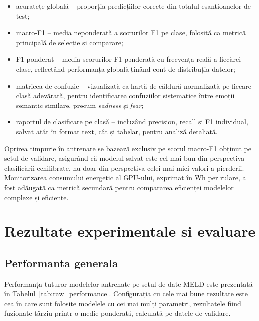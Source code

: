 \documentclass[12pt, a4paper]{article}
\begin{document}
\begin{itemize}
\item acuratețe globală -- proporția predicțiilor corecte din totalul eșantioanelor de test;
\item macro-F1 -- media neponderată a scorurilor F1 pe clase, folosită ca metrică principală de selecție și comparare;
\item F1 ponderat -- media scorurilor F1 ponderată cu frecvența reală a fiecărei clase, reflectând performanța globală ținând cont de distribuția datelor;
\item matricea de confuzie -- vizualizată ca hartă de căldură normalizată pe fiecare clasă adevărată, pentru identificarea confuziilor sistematice între emoții semantic similare, precum \textit{sadness} și \textit{fear};
\item raportul de clasificare pe clasă -- incluzând precision, recall și F1 individual, salvat atât în format text, cât și tabelar, pentru analiză detaliată.
\end{itemize}

Oprirea timpurie în antrenare se bazează exclusiv pe scorul macro-F1 obținut pe setul de validare, asigurând că modelul salvat este cel mai bun din perspectiva clasificării echilibrate, nu doar din perspectiva celei mai mici valori a pierderii. Monitorizarea consumului energetic al GPU-ului, exprimat în Wh per rulare, a fost adăugată ca metrică secundară pentru compararea eficienței modelelor complexe și eficiente.
\newpage
\section{Rezultate experimentale si evaluare}

\subsection{Performanta generala}
Performanța tuturor modelelor antrenate pe setul de date MELD este prezentată în Tabelul~\ref{tab:raw_performance}. Configurația cu cele mai bune rezultate este cea în care sunt folosite modelele cu cei mai mulți parametri, rezultatele fiind fuzionate târziu printr-o medie ponderată, calculată pe datele de validare.
\end{document}
